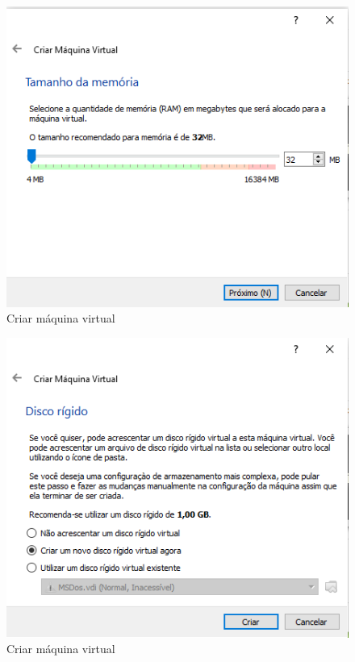 \documentclass{report}
\begin{document}
\begin{figure}
\centering
\includegraphics[width=\textwidth]{Screenshot_3.png}
\caption{Criar máquina virtual}
\label{fig:3}
\end{figure}

\begin{figure}
\centering
\includegraphics[width=\textwidth]{Screenshot_4.png}
\caption{Criar máquina virtual}
\label{fig:4}
\end{figure}
\end{document}
